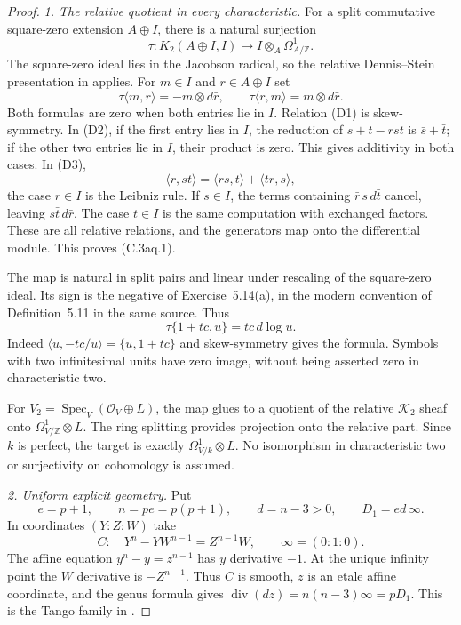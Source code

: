 \begin{proof}
\emph{1. The relative quotient in every characteristic.}
For a split commutative square-zero extension $A\oplus I$,
there is a natural surjection
\[
 \tau:K_2(A\oplus I,I)\longrightarrow
                                  I\otimes_A\Omega^1_{A/\mathbb Z}.
                                                        \tag{C.3aq.1}
\]
The square-zero ideal lies in the Jacobson radical, so the
relative Dennis--Stein presentation in
\citet[Chapter~III, Theorem~5.11.1(b), p.~44]{frWeibelKbookIII}
applies. For $m\in I$ and $r\in A\oplus I$ set
\[
 \tau\langle m,r\rangle=-m\otimes d\bar r,
 \qquad \tau\langle r,m\rangle=m\otimes d\bar r.
                                                        \tag{C.3aq.2}
\]
Both formulas are zero when both entries lie in $I$.
Relation (D1) is skew-symmetry. In (D2), if the first
entry lies in $I$, the reduction of $s+t-rst$ is
$\bar s+\bar t$; if the other two entries lie in $I$,
their product is zero. This gives additivity in both
cases. In (D3),
\[
 \langle r,st\rangle=\langle rs,t\rangle+\langle tr,s\rangle,
\]
the case $r\in I$ is the Leibniz rule. If $s\in I$,
the terms containing $\bar r\,s\,d\bar t$ cancel,
leaving $s\bar t\,d\bar r$. The case $t\in I$
is the same computation with exchanged factors.
These are all relative relations, and the generators
map onto the differential module. This proves (C.3aq.1).

The map is natural in split pairs and linear under
rescaling of the square-zero ideal. Its sign is the
negative of Exercise~5.14(a), in the modern convention
of Definition~5.11 in the same source. Thus
\[
                    \tau\{1+tc,u\}=tc\,d\log u.
                                                        \tag{C.3aq.3}
\]
Indeed $\langle u,-tc/u\rangle=\{u,1+tc\}$ and
skew-symmetry gives the formula. Symbols with two
infinitesimal units have zero image, without being
asserted zero in characteristic two.

For $V_2=\operatorname{Spec}_V(\mathcal O_V\oplus L)$,
the map glues to a quotient of the relative $\mathcal K_2$
sheaf onto $\Omega^1_{V/\mathbb Z}\otimes L$.
The ring splitting provides projection onto the relative
part. Since $k$ is perfect, the target is exactly
$\Omega^1_{V/k}\otimes L$. No isomorphism in characteristic
two or surjectivity on cohomology is assumed.

\emph{2. Uniform explicit geometry.}
Put
\[
 e=p+1,\qquad n=pe=p(p+1),\qquad d=n-3>0,
                         \qquad D_1=ed\,\infty.
\]
In coordinates $(Y:Z:W)$ take
\[
 C:\quad Y^n-YW^{n-1}=Z^{n-1}W,
                       \qquad \infty=(0:1:0).
                                                        \tag{C.3aq.4}
\]
The affine equation $y^n-y=z^{n-1}$ has $y$ derivative
$-1$. At the unique infinity point the $W$ derivative
is $-Z^{n-1}$. Thus $C$ is smooth, $z$ is an etale
affine coordinate, and the genus formula gives
$\operatorname{div}(dz)=n(n-3)\infty=pD_1$.
This is the Tango family in
\citet[Example~1.3 and Lemma~1.4, author pp.~3--4]{D_Mukai2011}.


\end{proof}
